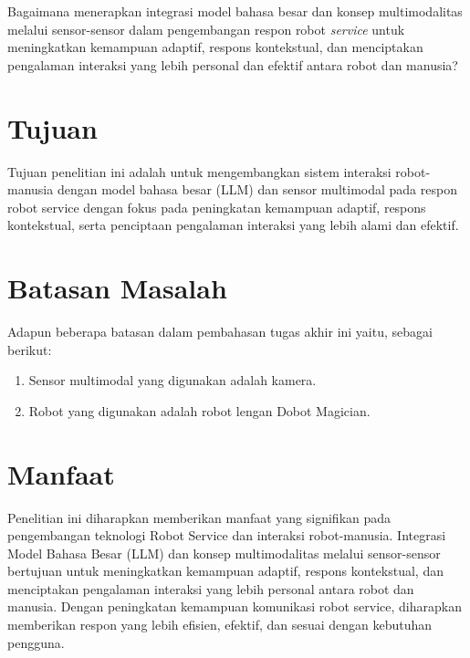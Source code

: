 Bagaimana menerapkan integrasi model bahasa besar dan konsep multimodalitas melalui sensor-sensor dalam pengembangan respon robot \emph{service} untuk meningkatkan kemampuan adaptif, respons kontekstual, dan menciptakan pengalaman interaksi yang lebih personal dan efektif antara robot dan manusia?

\section{Tujuan}
\label{sec:Tujuan}
Tujuan penelitian ini adalah untuk mengembangkan sistem interaksi robot-manusia dengan model bahasa besar (LLM) dan sensor multimodal pada respon robot service dengan fokus pada peningkatan kemampuan adaptif, respons kontekstual, serta penciptaan pengalaman interaksi yang lebih alami dan efektif.

\section{Batasan Masalah}
\label{sec:batasanmasalah}

Adapun beberapa batasan dalam pembahasan tugas akhir ini yaitu, sebagai berikut:

\begin{enumerate}[itemsep=0pt]
    \item Sensor multimodal yang digunakan adalah kamera.
    \item Robot yang digunakan adalah robot lengan Dobot Magician. 
\end{enumerate}

\section{Manfaat}
\label{sec:sistematikapenulisan}

Penelitian ini diharapkan memberikan manfaat yang signifikan pada pengembangan teknologi Robot Service dan interaksi robot-manusia. Integrasi Model Bahasa Besar (LLM) dan konsep multimodalitas melalui sensor-sensor bertujuan untuk meningkatkan kemampuan adaptif, respons kontekstual, dan menciptakan pengalaman interaksi yang lebih personal antara robot dan manusia. Dengan peningkatan kemampuan komunikasi robot service, diharapkan memberikan respon yang lebih efisien, efektif, dan sesuai dengan kebutuhan pengguna. 
